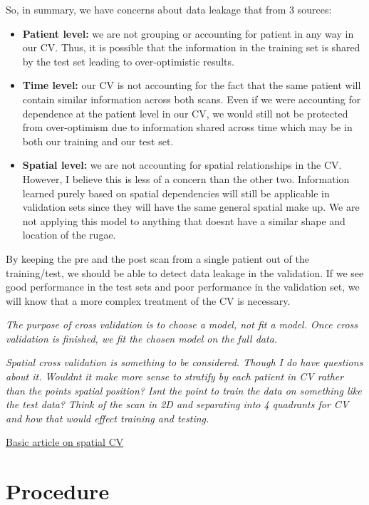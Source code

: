 \documentclass[11pt]{article}
\theoremstyle{definition}
\begin{document}
So, in summary, we have concerns about data leakage that from 3 sources:
\begin{itemize}
    \item \textbf{Patient level:} we are not grouping or accounting for patient in any way in our CV. Thus, it is possible that the information in the training set is shared by the test set leading to over-optimistic results.
    \item \textbf{Time level:} our CV is not accounting for the fact that the same patient will contain similar information across both scans. Even if we were accounting for dependence at the patient level in our CV, we would still not be protected from over-optimism due to information shared across time which may be in both our training and our test set.
    \item \textbf{Spatial level:} we are not accounting for spatial relationships in the CV. However, I believe this is less of a concern than the other two. Information learned purely based on spatial dependencies will still be applicable in validation sets since they will have the same general spatial make up. We are not applying this model to anything that doesnt have a similar shape and location of the rugae.
\end{itemize}

By keeping the pre and the post scan from a single patient out of the training/test, we should be able to detect data leakage in the validation. If we see good performance in the test sets and poor performance in the validation set, we will know that a more complex treatment of the CV is necessary.


\textit{The purpose of cross validation is to choose a model, not fit a model. Once cross validation is finished, we fit the chosen model on the full data.}

\textit{Spatial cross validation is something to be considered. Though I do have questions about it. Wouldnt it make more sense to stratify by each patient in CV rather than the points spatial position? Isnt the point to train the data on something like the test data? Think of the scan in 2D and separating into 4 quadrants for CV and how that would effect training and testing.}

\href{https://towardsdatascience.com/spatial-cross-validation-using-scikit-learn-74cb8ffe0ab9/}{Basic article on spatial CV}


\section{Procedure}
\end{document}
